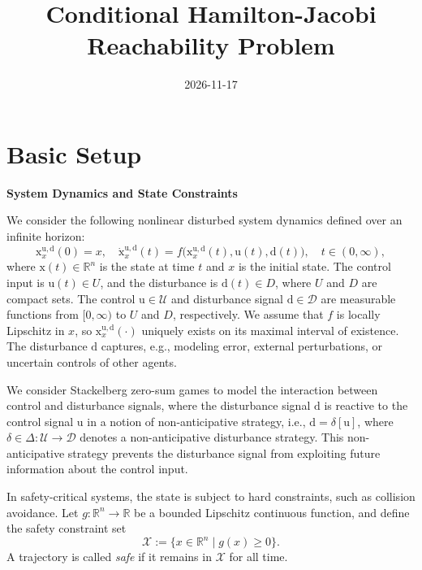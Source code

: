 \documentclass[12pt]{article}
\title{\LARGE \textbf{Conditional Hamilton-Jacobi Reachability Problem}
}
\author{2026-11-17}
\makeatletter
\renewcommand{\maketitle}{%
    \begin{center}
        \vspace*{0.5cm}
        \Large\@title
        
        \vspace{0.4cm}
        \large\@author
    \end{center}
}
\makeatother
\begin{document}
\maketitle

\section{Basic Setup}

\noindent\textbf{System Dynamics and State Constraints}

We consider the following nonlinear disturbed system dynamics defined over an infinite horizon:
\begin{equation}
    \mathrm{x}_{x}^{\mathrm{u},\mathrm{d}}(0)=x,\quad 
    \dot{\mathrm{x}}_{x}^{\mathrm{u},\mathrm{d}}(t)=f\bigl(\mathrm{x}_{x}^{\mathrm{u},\mathrm{d}}(t),\mathrm{u}(t),\mathrm{d}(t)\bigr),
    \quad t\in(0,\infty),
    \label{eq:dynamics}
\end{equation}
where $\mathrm{x}(t)\in\mathbb{R}^{n}$ is the state at time $t$ and $x$ is the initial state. The control input is $\mathrm{u}(t)\in U$, and the disturbance is $\mathrm{d}(t)\in D$, where $U$ and $D$ are compact sets. The control $\mathrm{u}\in\mathcal{U}$ and disturbance signal $\mathrm{d}\in\mathcal{D}$ are measurable functions from $[0,\infty)$ to $U$ and $D$, respectively. We assume that $f$ is locally Lipschitz in $x$, so $\mathrm{x}_{x}^{\mathrm{u},\mathrm{d}}(\cdot)$ uniquely exists on its maximal interval of existence. The disturbance $\mathrm{d}$ captures, e.g., modeling error, external perturbations, or uncertain controls of other agents. 

We consider Stackelberg zero-sum games to model the interaction between control and disturbance signals, where the disturbance signal $\mathrm{d}$ is reactive to the control signal $\mathrm{u}$ in a notion of non-anticipative strategy, i.e., $\mathrm{d}=\delta[\mathrm{u}]$, where $\delta\in\Delta:\mathcal{U}\to\mathcal{D}$ denotes a non-anticipative disturbance strategy. This non-anticipative strategy prevents the disturbance signal from exploiting future information about the control input.

In safety-critical systems, the state is subject to hard constraints, such as collision avoidance. Let $g:\mathbb{R}^{n}\to\mathbb{R}$ be a bounded Lipschitz continuous function, and define the safety constraint set
\begin{equation}
    \mathcal{X}:=\{x\in\mathbb{R}^{n}\mid g(x)\ge 0\}.
    \label{eq:state_constraints_set}
\end{equation}
A trajectory is called \emph{safe} if it remains in $\mathcal{X}$ for all time.
\end{document}

